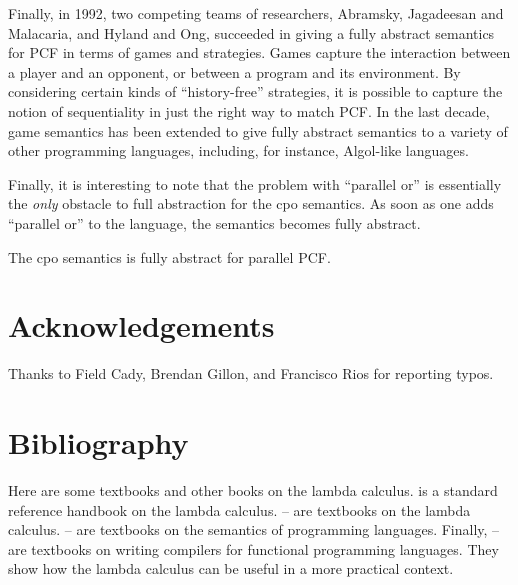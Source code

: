 \documentclass[12pt]{article}
\begin{document}
Finally, in 1992, two competing teams of researchers, Abramsky,
Jagadeesan and Malacaria, and Hyland and Ong, succeeded in giving a
fully abstract semantics for PCF in terms of games and strategies.
Games capture the interaction between a player and an opponent, or
between a program and its environment. By considering certain kinds of
``history-free'' strategies, it is possible to capture the notion of
sequentiality in just the right way to match PCF. In the last decade,
game semantics has been extended to give fully abstract semantics to a
variety of other programming languages, including, for instance,
Algol-like languages.

Finally, it is interesting to note that the problem with ``parallel or''
is essentially the {\em only} obstacle to full abstraction for the cpo
semantics. As soon as one adds ``parallel or'' to the language, the
semantics becomes fully abstract.

\begin{theorem}
  The cpo semantics is fully abstract for parallel PCF.
\end{theorem}

\section{Acknowledgements}

Thanks to Field Cady, Brendan Gillon, and Francisco Rios for reporting
typos.

\section{Bibliography}\label{ssec-bibliography}

Here are some textbooks and other books on the lambda calculus.
{\cite{Bar84}} is a standard reference handbook on the lambda
calculus.  \cite{GLT89}--\!\cite{Rev88} are textbooks on the lambda
calculus. {\cite{Win93}}--\!\!\cite{Hen90} are textbooks on the
semantics of programming languages. Finally,
{\cite{Pey87}--\!\cite{App92}} are textbooks on writing compilers for
functional programming languages. They show how the lambda calculus
can be useful in a more practical context.
\end{document}
